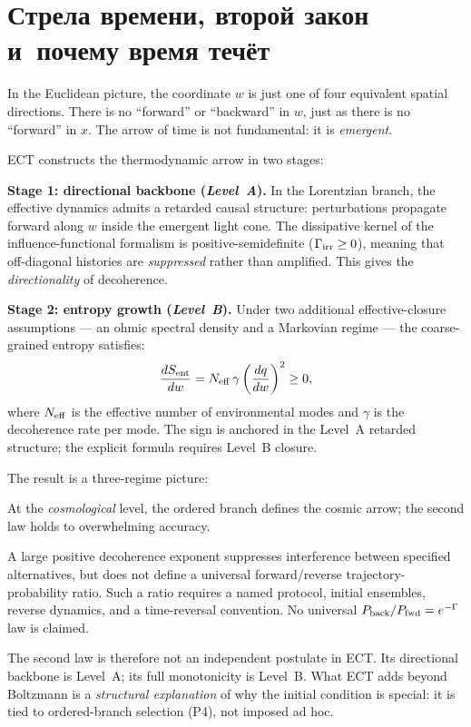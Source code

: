 \documentclass[11pt,a4paper]{article}
\begin{document}
\section{Стрела времени, второй закон и~почему время течёт}
\label{sec:pop_arrow}

In the Euclidean picture, the coordinate $w$ is just one of four equivalent spatial directions. There is no ``forward'' or ``backward'' in $w$, just as there is no ``forward'' in $x$. The arrow of time is not fundamental: it is \emph{emergent}.

ECT constructs the thermodynamic arrow in two stages:

\textbf{Stage 1: directional backbone (\emph{Level~A}).} In the Lorentzian branch, the effective dynamics admits a retarded causal structure: perturbations propagate forward along $w$ inside the emergent light cone. The dissipative kernel of the influence-functional formalism is positive-semidefinite ($\Gamma_{\rm irr} \geq 0$), meaning that off-diagonal histories are \emph{suppressed} rather than amplified. This gives the \emph{directionality} of decoherence.

\textbf{Stage 2: entropy growth (\emph{Level~B}).} Under two additional effective-closure assumptions --- an ohmic spectral density and a Markovian regime --- the coarse-grained entropy satisfies:
\begin{equation}
  \frac{dS_{\rm ent}}{dw} = N_{\rm eff}\,\gamma
  \left(\frac{dq}{dw}\right)^2 \geq 0,
  \label{eq:pop_2ndlaw}
\end{equation}
where $N_{\rm eff}$ is the effective number of environmental modes and $\gamma$ is the decoherence rate per mode. The sign is anchored in the Level~A retarded structure; the explicit formula requires Level~B closure.

The result is a three-regime picture:

At the \emph{cosmological} level, the ordered branch defines the cosmic arrow; the second law holds to overwhelming accuracy.

A large positive decoherence exponent suppresses interference between
specified alternatives, but does not define a universal forward/reverse
trajectory-probability ratio.  Such a ratio requires a named protocol, initial
ensembles, reverse dynamics, and a time-reversal convention.  No universal
$P_{\rm back}/P_{\rm fwd}=e^{-\Gamma}$ law is claimed.

The second law is therefore not an independent postulate in ECT. Its directional backbone is Level~A; its full monotonicity is Level~B. What ECT adds beyond Boltzmann is a \emph{structural explanation} of why the initial condition is special: it is tied to ordered-branch selection (P4), not imposed ad hoc.
\end{document}
